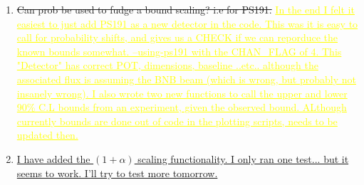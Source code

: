 \documentclass[11pt, a4paper]{article}
\newcommand{\newtext}[2]{\textcolor{#1}{\ul{#2}}}
\begin{document}
\begin{enumerate}
\item \sout{Can prob be used to fudge a bound scaling? i.e for PS191.} \newtext{MARK}{In the end I felt it easiest to just add PS191 as a new detector in the code. This was it is easy to call for probability shifts, and gives us a CHECK if we can reporduce the known bounds somewhat.
	--using-ps191 with the CHAN\_FLAG of 4.
This "Detector" has correct POT, dimensions, baseline ..etc.. although the associated flux is assuming the BNB beam (which is wrong, but probably not insanely wrong). I also wrote two new functions to call the upper and lower 90\% C.L bounds from an experiment, given the observed bound. ALthough currently bounds are done out of code in the plotting scripts, needs to be updated then. }
\item \newtext{PB}{I have added the $(1+\alpha)$ scaling functionality. I only ran one test... but it seems to work. I'll try to test more tomorrow.} 

\end{enumerate}



{}
\end{document}
